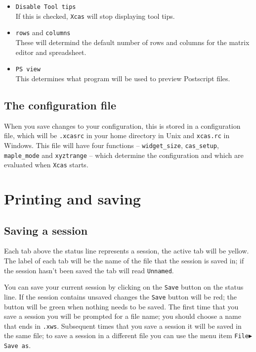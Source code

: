 \documentclass[a4paper,11pt]{book}
\begin{document}
\begin{itemize}
  \item \texttt{Disable Tool tips}\\
  If this is checked, \texttt{Xcas} will stop displaying tool tips.
  
  \item \texttt{rows} and \texttt{columns}\\
  These will determind the default number of rows and columns for the
  matrix editor and spreadsheet.
  
  \item \texttt{PS view}\\
  This determines what program will be used to preview Postscript files.
  
  
\end{itemize}

\subsection{The configuration file}
\label{ssec:conffile}

When you save changes to your configuration, this is stored in a
configuration file, which will be \texttt{.xcasrc} in your home
directory in Unix and \texttt{xcas.rc} in Windows.  This file will
have four functions -- \texttt{widget\_size}, \texttt{cas\_setup}, 
\texttt{maple\_mode} and \texttt{xyztrange} -- which determine the
configuration and which are evaluated when \texttt{Xcas} starts.

\section{Printing and saving}

\subsection{Saving a session}

Each tab above the status line represents a session, the active tab
will be yellow.  The label of each tab will be the name of the file
that the session is saved in; if the session hasn't been saved the tab
will read \texttt{Unnamed}.

You can save your current session by clicking on the \texttt{Save}
button on the status line.  If the session contains unsaved changes
the \texttt{Save} button will be red; the button will be green when
nothing needs to be saved.  The first time that you save a session you
will be prompted for a file name; you should choose a name that ends
in \texttt{.xws}.  Subsequent times that you save a session it will be
saved in the same file; to save a session in a different file you can
use the menu item \texttt{File$\blacktriangleright$Save as}.
\end{document}
